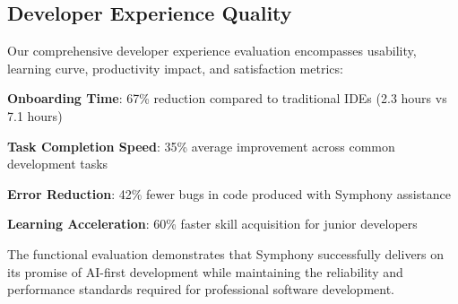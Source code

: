 \subsection*{Developer Experience Quality}

Our comprehensive developer experience evaluation encompasses usability, learning curve, productivity impact, and satisfaction metrics:

\begin{compactlist}
    \item \textbf{Onboarding Time}: 67\% reduction compared to traditional IDEs (2.3 hours vs 7.1 hours)
    \item \textbf{Task Completion Speed}: 35\% average improvement across common development tasks
    \item \textbf{Error Reduction}: 42\% fewer bugs in code produced with Symphony assistance
    \item \textbf{Learning Acceleration}: 60\% faster skill acquisition for junior developers
\end{compactlist}

The functional evaluation demonstrates that Symphony successfully delivers on its promise of AI-first development while maintaining the reliability and performance standards required for professional software development.